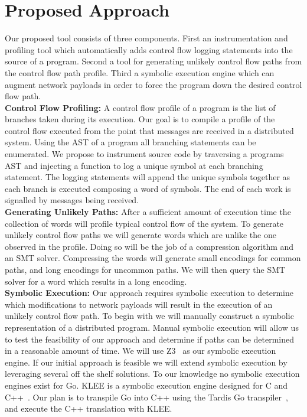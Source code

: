\section{Proposed Approach}
\label{sec:proposed-approach}

Our proposed tool consists of three components. First an
instrumentation and profiling tool which automatically adds control
flow logging statements into the source of a program. Second a tool
for generating unlikely control flow paths from the control flow path
profile. Third a symbolic execution engine which can augment network
payloads in order to force the program down the desired control flow
path.  \\
%
\noindent\textbf{Control Flow Profiling:} A control flow profile of a
program is the list of branches taken during its execution. Our goal
is to compile a profile of the control flow executed from the point
that messages are received in a distributed system. Using the AST of a
program all branching statements can be enumerated. We propose to
instrument source code by traversing a programs AST and injecting a
function to log a unique symbol at each branching statement. The
logging statements will append the unique symbols together as each
branch is executed composing a word of symbols. The end of each work
is signalled by messages being received.  \\
%
\noindent\textbf{Generating Unlikely Paths:} After a sufficient amount
of execution time the collection of words will profile typical control
flow of the system. To generate unlikely control flow paths we will
generate words which are unlike the one observed in the profile. Doing
so will be the job of a compression algorithm and an SMT solver.
Compressing the words will generate small encodings for common paths,
and long encodings for uncommon paths. We will then query the SMT
solver for a word which results in a long encoding.  \\
%
\noindent\textbf{Symbolic Execution:} Our approach requires symbolic
execution to determine which modifications to network payloads will
result in the execution of an unlikely control flow path. To begin
with we will manually construct a symbolic representation of a
distributed program. Manual symbolic execution will allow us to test
the feasibility of our approach and determine if paths can be
determined in a reasonable amount of time. We will use
Z3~\cite{4144534} as our symbolic execution engine. If our initial
approach is feasible we will extend symbolic execution by leveraging
several off the shelf solutions. To our knowledge no symbolic
execution engines exist for Go. KLEE is a symbolic execution engine
designed for C and C++~\cite{Cadar_klee:unassisted}. Our plan is to
transpile Go into C++ using the Tardis Go transpiler~\cite{tardisgo},
and execute the C++ translation with KLEE.


